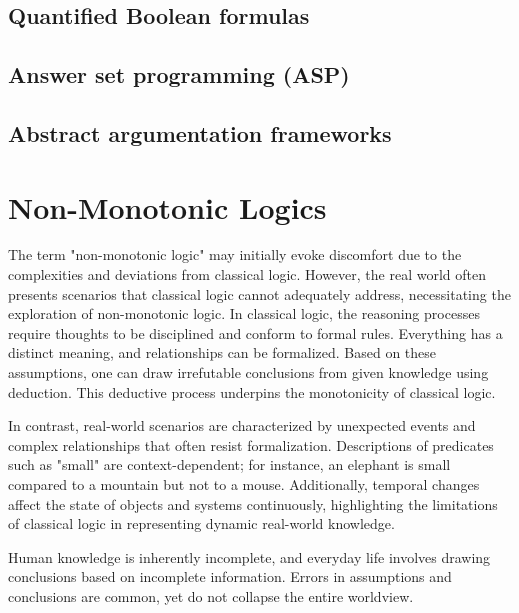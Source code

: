 \subsection{Quantified Boolean formulas}
\cite{gelfond_logic_2002}

\subsection{Answer set programming (ASP)}
\cite{brewka_answer_2011}

\subsection{Abstract argumentation frameworks}
\cite{dung_acceptability_1995}

\section{Non-Monotonic Logics}
The term "non-monotonic logic" may initially evoke discomfort due to the complexities and deviations from classical logic.
However, the real world often presents scenarios that classical logic cannot adequately address, necessitating the exploration of non-monotonic logic.
In classical logic, the reasoning processes require thoughts to be disciplined and conform to formal rules.
Everything has a distinct meaning, and relationships can be formalized. Based on these assumptions, one can draw irrefutable conclusions from given knowledge using deduction.
This deductive process underpins the monotonicity of classical logic.

In contrast, real-world scenarios are characterized by unexpected events and complex relationships that often resist formalization.
Descriptions of predicates such as "small" are context-dependent; for instance, an elephant is small compared to a mountain but not to a mouse.
Additionally, temporal changes affect the state of objects and systems continuously, highlighting the limitations of classical logic in representing dynamic real-world knowledge.

Human knowledge is inherently incomplete, and everyday life involves drawing conclusions based on incomplete information.
Errors in assumptions and conclusions are common, yet do not collapse the entire worldview.

